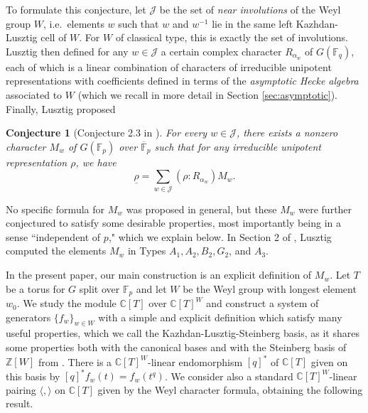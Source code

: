 \documentclass{amsart}
\newtheorem{conjecture}[thm]{Conjecture}
\theoremstyle{definition}
\begin{document}
To formulate this conjecture, let $\mathcal{J}$ be the set of \emph{near involutions} of the Weyl group $W$, i.e.\ elements $w$ such that $w$ and $w^{-1}$ lie in the same left Kazhdan-Lusztig cell of $W$. For $W$ of classical type, this is exactly the set of involutions. Lusztig then defined for any $w \in \mathcal{J}$ a certain complex character $R_{\alpha_w}$ of $G(\mathbb{F}_q)$, each of which is a linear combination of characters of irreducible unipotent representations with coefficients defined in terms of the \emph{asymptotic Hecke algebra} associated to $W$ (which we recall in more detail in Section \ref{sec:asymptotic}). Finally, Lusztig proposed

\begin{conjecture}[Conjecture 2.3 in \cite{L}]\label{conj:lusztig}
\label{part:main}For every $w \in \mathcal{J}$, there exists a nonzero character $M_w$ of $G(\mathbb{F}_p)$ over $\overline{\mathbb{F}}_{p}$ such that for any irreducible unipotent representation $\rho$, we have
\begin{equation}
    \underline{\rho} = \sum_{w \in \mathcal{J}} (\rho : R_{\alpha_w})M_w.\label{eqn:formulaone}
\end{equation}
\end{conjecture}
No specific formula for $M_w$ was proposed in general, but these $M_w$ were further conjectured to satisfy some desirable properties, most importantly being in a sense ``independent of $p$," which we explain below. In Section 2 of \cite{L}, Lusztig computed the elements $M_w$ in Types $A_1, A_2, B_2, G_2$, and $A_3$.

In the present paper, our main construction is an explicit definition of $M_w$. Let $T$ be a torus for $G$ split over $\mathbb{F}_p$ and let $W$ be the Weyl group with longest element $w_0$. We study the module $\mathbb{C}[T]$ over $\mathbb{C}[T]^W$ and construct a system of generators $\{f_w\}_{w \in W}$ with a simple and explicit definition which satisfy many useful properties, which we call the Kazhdan-Lusztig-Steinberg basis, as it shares
some properties both with the canonical bases and with the Steinberg basis of ${\mathbb Z}[W]$
from \cite{St}.
There is a $\mathbb{C}[T]^W$-linear endomorphism $[q]^*$ of $\mathbb{C}[T]$ given on this basis by $[q]^*f_w(t) = f_w(t^q)$. We consider also a standard $\mathbb{C}[T]^W$-linear pairing $\langle, \rangle$ on $\mathbb{C}[T]$ given by the Weyl character formula, obtaining the following result.
\end{document}
